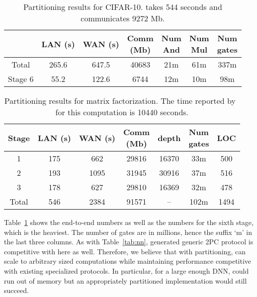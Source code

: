 \setlength\tabcolsep{6pt}
\begin{table}
\footnotesize
\begin{tabular}{|c|c|c|c |c|c|c|}
\hline
           &  LAN (s) & WAN (s) & \thead{Comm \\ (Mb)}  & \thead{Num \\ And} & \thead{Num \\ Mul} & \thead{Num \\ gates} \\
\hline
Total      &  265.6       & 647.5        & 40683       & 21m    & 61m    &  337m  \\
\hline
Stage 6    &  55.2        & 122.6        & 6744        & 12m    & 10m   &  98m  \\
\hline
\end{tabular}

 \caption{Partitioning results for CIFAR-10. \minion takes 544 seconds and communicates 9272 Mb.}
 \label{tab:cifar} 
\end{table}

\begin{table}[t]
\footnotesize
\begin{tabular}{|c|c|c|c |c|c| c|}
\hline
  Stage         &  LAN (s) & WAN (s) & \thead{Comm \\ (Mb)}  & depth & \thead{Num \\ gates} & LOC\\
\hline
1    &  175       & 662        & 29816       & 16370    & 33m    & 500  \\
\hline
2    &  193        & 1095        & 31945        & 30916    & 37m & 516 \\
\hline
3    &  178        & 627        & 29810        & 16369    & 32m  & 478  \\
\hline
Total    &  546      & 2384        & 91571        & --    & 102m & 1494 \\
\hline
\end{tabular}

 \caption{Partitioning results for matrix factorization. The time reported by~\cite{valeriaMatrix} for this computation is 10440 seconds.}
 \label{tab:factor} 
\end{table}
Table~\ref{tab:cifar} shows the end-to-end numbers as
well as the numbers for the sixth stage, which is the heaviest. 
The number of gates are in millions, hence the suffix `m' in the last
three columns.
As with Table~\ref{tab:nn}, \tool generated generic 2PC protocol is
competitive with \minion here as well. Therefore,
we believe that with partitioning, \tool can scale to arbitrary sized
computations while maintaining performance
competitive with existing specialized protocols. In particular, for a
large enough DNN, \minion could run
out of memory but an appropriately partitioned \tool implementation would still
succeed.

